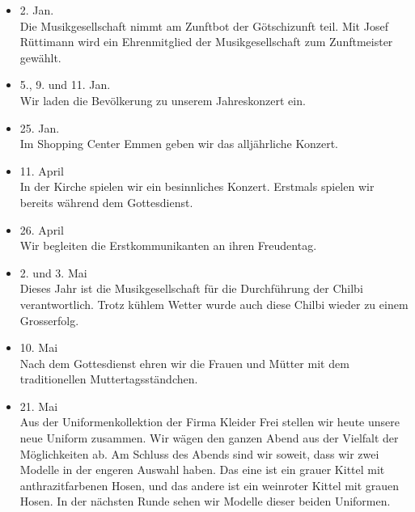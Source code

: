 \begin{history}


    \begin{itemize}

        \item[]2. Jan.\\
        Die Musikgesellschaft nimmt am Zunftbot der Götschizunft teil. Mit Josef
        Rüttimann wird ein Ehrenmitglied der Musikgesellschaft zum Zunftmeister
        gewählt.

        \item[]5., 9. und 11. Jan.\\
        Wir laden die Bevölkerung zu unserem Jahreskonzert ein.

        \item[]25. Jan.\\
        Im Shopping Center Emmen geben wir das alljährliche Konzert.

        \item[]11. April\\
        In der Kirche spielen wir ein besinnliches Konzert. Erstmals spielen wir
        bereits während dem Gottesdienst.

        \item[]26. April\\
        Wir begleiten die Erstkommunikanten an ihren Freudentag.

        \item[]2. und 3. Mai\\
        Dieses Jahr ist die Musikgesellschaft für die Durchführung der Chilbi
        verantwortlich. Trotz kühlem Wetter wurde auch diese Chilbi wieder zu
        einem Grosserfolg.

        \item[]10. Mai\\
        Nach dem Gottesdienst ehren wir die Frauen und Mütter mit dem
        traditionellen Muttertagsständchen.

        \item[]21. Mai\\
        Aus der Uniformenkollektion der Firma Kleider Frei stellen wir heute
        unsere neue Uniform zusammen. Wir wägen den ganzen Abend aus der
        Vielfalt der Möglichkeiten ab. Am Schluss des Abends sind wir soweit,
        dass wir zwei Modelle in der engeren Auswahl haben. Das eine ist ein
        grauer Kittel mit anthrazitfarbenen Hosen, und das andere ist ein
        weinroter Kittel mit grauen Hosen. In der nächsten Runde sehen wir
        Modelle dieser beiden Uniformen.


\end{itemize}
\end{history}

